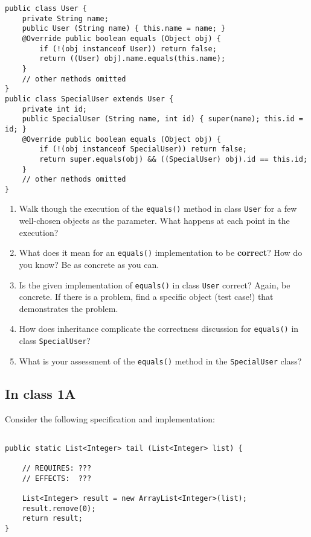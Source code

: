 \documentclass[11pt]{article}
\begin{document}
\begin{verbatim}
public class User {
    private String name;
    public User (String name) { this.name = name; }
    @Override public boolean equals (Object obj) {
        if (!(obj instanceof User)) return false;
        return ((User) obj).name.equals(this.name);
    }
    // other methods omitted
}
public class SpecialUser extends User {
    private int id;
    public SpecialUser (String name, int id) { super(name); this.id = id; }
    @Override public boolean equals (Object obj) {
        if (!(obj instanceof SpecialUser)) return false;
        return super.equals(obj) && ((SpecialUser) obj).id == this.id;
    }
    // other methods omitted
}
\end{verbatim}

\begin{enumerate}
\item Walk though the execution of the \texttt{equals()} method in class \texttt{User} for a few well-chosen objects as the parameter. What happens at each point in the execution?
\item What does it mean for an \texttt{equals()} implementation to be \textbf{correct}? How do you know? Be as concrete as you can.
\item Is the given implementation of \texttt{equals()} in class \texttt{User} correct? Again, be concrete. If there is a problem, find a specific object (test case!) that demonstrates the problem.
\item How does inheritance complicate the correctness discussion for \texttt{equals()} in class \texttt{SpecialUser}?
\item What is your assessment of the \texttt{equals()} method in the \texttt{SpecialUser} class?
\end{enumerate}

\subsection{In class 1A}
\label{sec:org629117e}
Consider the following specification and implementation:

\begin{verbatim}

public static List<Integer> tail (List<Integer> list) {

    // REQUIRES: ???
    // EFFECTS:  ???

    List<Integer> result = new ArrayList<Integer>(list);
    result.remove(0);
    return result;
}
\end{verbatim}
\end{document}
